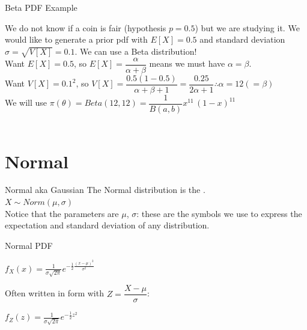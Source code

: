 \documentclass[10pt,sans,english,compress,xcolor=dvipsnames]{beamer}
\begin{document}
\begin{frame}{Beta PDF Example}
\small

We do not know if a coin is fair (hypothesis $p=0.5$) but we are studying it. We would like to generate a prior pdf with $E[X] =0.5$ and standard deviation $\sigma=\sqrt{V[X]}=0.1$. We can use a Beta distribution!\\[2ex]
Want $E[X] = 0.5$, so $E[X] = \dfrac{\alpha}{\alpha+\beta}$ means we must have $\alpha=\beta$.\\[2ex]
Want $V[X] = 0.1^2$, so $V[X]  = \dfrac{0.5(1-0.5) }{ \alpha+\beta+1} = \dfrac{0.25}{2\alpha+1} \therefore \alpha=12 (=\beta)$\\[2ex]
We will use $\pi(\theta) =  Beta(12,12) =  \dfrac{1}{B(a,b) }x^{11}\, (1-x)^{11}$\\[2ex]
\\[1ex]
\end{frame}



\section{Normal}

\begin{frame}{Normal aka Gaussian}
The Normal distribution is the .\\[1ex]

$X \sim Norm(\mu, \sigma)$\\[2ex]

Notice that the parameters are $\mu$, $\sigma$: these are the symbols we use to express the expectation and standard deviation of any distribution. \\[1ex]

\end{frame} 

\begin{frame}{Normal  PDF}


$f_X(x) = \frac{1}{\sigma \sqrt{2\pi}} e^{-\frac{1}{2} \frac{(x-\mu)^2}{\sigma^2}}$\\[1ex]

\vspace{0.5cm}

\normalsize
Often written in  form with $Z=\dfrac{X-\mu}{\sigma}$:\\[3ex]
\vspace{0.5cm}

$f_Z(z) = \frac{1}{\sigma \sqrt{2\pi}} e^{-\frac{1}{2} z^2}$\\[1ex]


\end{frame} 
\end{document}
